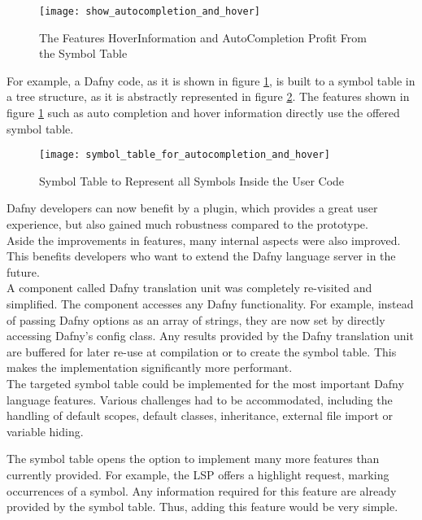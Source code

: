 \begin{figure}[H]
    \centering
    \texttt{[image: show\_autocompletion\_and\_hover]}
    \caption{The Features HoverInformation and AutoCompletion Profit From the Symbol Table}
    \label{fig:show_autocompletion_and_hover}
\end{figure}

For example, a Dafny code, as it is shown in figure \ref{fig:show_autocompletion_and_hover},
is built to a symbol table in a tree structure, as it is abstractly represented in figure \ref{fig:symbol_table_for_autocompletion_and_hover}.
The features shown in figure \ref{fig:show_autocompletion_and_hover} such as auto completion and hover information directly use the offered symbol table.

\begin{figure}[H]
    \centering
    \texttt{[image: symbol\_table\_for\_autocompletion\_and\_hover]}
    \caption{Symbol Table to Represent all Symbols Inside the User Code}
    \label{fig:symbol_table_for_autocompletion_and_hover}
\end{figure}

Dafny developers can now benefit by a plugin, which provides a great user experience, but also gained much robustness compared to the prototype.\\

Aside the improvements in features, many internal aspects were also improved.
This benefits developers who want to extend the Dafny language server in the future.\\

A component called Dafny translation unit was completely re-visited and simplified.
The component accesses any Dafny functionality.
For example, instead of passing Dafny options as an array of strings, they are now set by
directly accessing Dafny's config class.
Any results provided by the Dafny translation unit are buffered for later re-use at compilation or to create the symbol table.
This makes the implementation significantly more performant.\\

The targeted symbol table could be implemented for the most important Dafny language features.
Various challenges had to be accommodated, including the handling of default scopes, default classes, inheritance, external file import or variable hiding.

The symbol table opens the option to implement many more features than currently provided.
For example, the LSP offers a highlight request, marking occurrences of a symbol.
Any information required for this feature are already provided by the symbol table.
Thus, adding this feature would be very simple.

